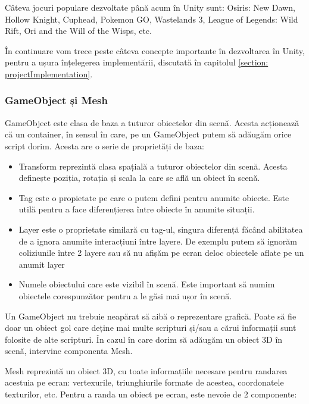 \documentclass[12pt, a4paper]{article}
\begin{document}
	Câteva jocuri populare dezvoltate până acum în Unity sunt: Osiris: New Dawn, Hollow Knight, Cuphead, Pokemon GO, Wastelands 3, League of Legends: Wild Rift, Ori and the Will of the Wisps, etc.
	\newline
	
	În continuare vom trece peste câteva concepte importante în dezvoltarea în Unity, pentru a ușura înțelegerea implementării, discutată în capitolul \hyperref[section: projectImplementation]{\ref{section: projectImplementation}}.
	
	
	
	
	\subsubsection{GameObject și Mesh}
	
	GameObject este clasa de baza a tuturor obiectelor din scenă. Acesta acționează că un container, în sensul în care, pe un GameObject putem să adăugăm orice script dorim. Acesta are o serie de proprietăți de baza:
	
	\begin{itemize}
		\item Transform reprezintă clasa spațială a tuturor obiectelor din scenă. Acesta definește poziția, rotația și scala la care se află un obiect în scenă.
		\item Tag este o propietate pe care o putem defini pentru anumite obiecte. Este utilă pentru a face diferențierea între obiecte în anumite situații. 
		\item Layer este o proprietate similară cu tag-ul, singura diferență făcând abilitatea de a ignora anumite interacțiuni între layere. De exemplu putem să ignorăm coliziunile între 2 layere sau să nu afișăm pe ecran deloc obiectele aflate pe un anumit layer
		\item Numele obiectului care este vizibil în scenă. Este important să numim obiectele corespunzător pentru a le găsi mai ușor în scenă.
	\end{itemize}
	
	Un GameObject nu trebuie neapărat să aibă o reprezentare grafică. Poate să fie doar un obiect gol care deține mai multe scripturi și/sau a cărui informații sunt folosite de alte scripturi. În cazul în care dorim să adăugăm un obiect 3D în scenă, intervine componenta Mesh.
	\newline
	
	Mesh reprezintă un obiect 3D, cu toate informațiile necesare pentru randarea acestuia pe ecran: vertexurile, triunghiurile formate de acestea, coordonatele texturilor, etc. Pentru a randa un obiect pe ecran, este nevoie de 2 componente:
	
\end{document}
